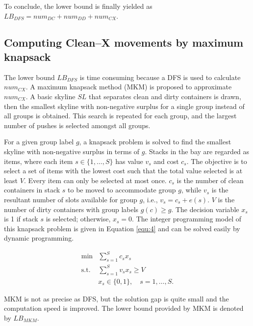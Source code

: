 \documentclass[review,3p,times,authoryear,12pt]{elsarticle}
\begin{document}
To conclude, the lower bound is finally yielded as $\mathit{LB}_\mathit{DFS}=\mathit{num}_\mathit{DC}+\mathit{num}_\mathit{DD}+\mathit{num}_\mathit{CX}$.

\subsection{Computing Clean--X movements by maximum knapsack}

The lower bound $\mathit{LB}_\mathit{DFS}$ is time consuming because a DFS is used to calculate $\mathit{num}_{\mathit{CX}}$.
A maximum knapsack method (MKM) is proposed to approximate $\mathit{num}_{CX}$.
A basic skyline $\mathit{SL}$ that separates clean and dirty containers is drawn, then the smallest skyline with non-negative surplus for a single group instead of all groups is obtained.
This search is repeated for each group, and the largest number of pushes is selected amongst all groups.

For a given group label $g$, a knapsack problem is solved to find the smallest skyline with non-negative surplus in terms of $g$.
Stacks in the bay are regarded as items, where each item $s\in\{1,\dots,S\}$ has value $v_s$ and cost $c_s$.
The objective is to select a set of items with the lowest cost such that the total value selected is at least $V$.
Every item can only be selected at most once.
$c_s$ is the number of clean containers in stack $s$ to be moved to accommodate group $g$, while $v_s$ is the resultant number of slots available for group $g$, i.e., $v_s=c_s+e(s)$.
$V$ is the number of dirty containers with group labels $g(c)\ge g$.
The decision variable $x_s$ is 1 if stack $s$ is selected; otherwise, $x_s=0$.
The integer programming model of this knapsack problem is given in Equation \ref{equ:4} and can be solved easily by dynamic programming.

\begin{equation}
\label{equ:4}
\begin{array}{rl}
\min & \sum_{s=1}^S c_s x_s\\
\mathrm{s.t.} &\sum_{s=1}^S v_s x_s\ge V\\
&x_s\in\{0,1\}, \quad s=1,\dots,S\textrm{.}
\end{array}
\end{equation}

MKM is not as precise as DFS, but the solution gap is quite small and the computation speed is improved.
The lower bound provided by MKM is denoted by $\mathit{LB}_{\mathit{MKM}}$.
\end{document}
